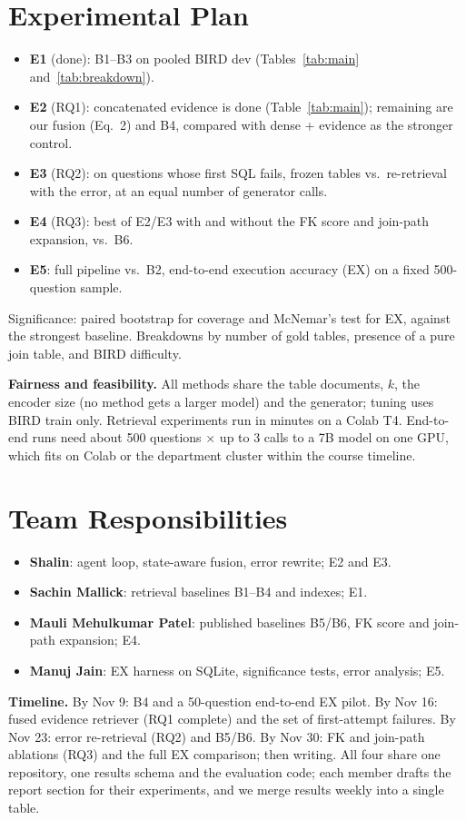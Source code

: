 \documentclass[sigconf,nonacm]{acmart}
\begin{document}
\section{Experimental Plan}
\begin{itemize}
\item \textbf{E1} (done): B1--B3 on pooled BIRD dev (Tables~\ref{tab:main} and~\ref{tab:breakdown}).
\item \textbf{E2} (RQ1): concatenated evidence is done (Table~\ref{tab:main}); remaining are our fusion (Eq.~2) and B4, compared with dense + evidence as the stronger control.
\item \textbf{E3} (RQ2): on questions whose first SQL fails, frozen tables vs.\ re-retrieval with the error, at an equal number of generator calls.
\item \textbf{E4} (RQ3): best of E2/E3 with and without the FK score and join-path expansion, vs.\ B6.
\item \textbf{E5}: full pipeline vs.\ B2, end-to-end execution accuracy (EX) on a fixed 500-question sample.
\end{itemize}
Significance: paired bootstrap for coverage and McNemar's test for EX, against the strongest baseline. Breakdowns by number of gold tables, presence of a pure join table, and BIRD difficulty.

\textbf{Fairness and feasibility.} All methods share the table documents, $k$, the encoder size (no method gets a larger model) and the generator; tuning uses BIRD train only. Retrieval experiments run in minutes on a Colab T4. End-to-end runs need about 500 questions $\times$ up to 3 calls to a 7B model on one GPU, which fits on Colab or the department cluster within the course timeline.

\section{Team Responsibilities}
\begin{itemize}
\item \textbf{Shalin}: agent loop, state-aware fusion, error rewrite; E2 and E3.
\item \textbf{Sachin Mallick}: retrieval baselines B1--B4 and indexes; E1.
\item \textbf{Mauli Mehulkumar Patel}: published baselines B5/B6, FK score and join-path expansion; E4.
\item \textbf{Manuj Jain}: EX harness on SQLite, significance tests, error analysis; E5.
\end{itemize}
\textbf{Timeline.} By Nov 9: B4 and a 50-question end-to-end EX pilot. By Nov 16: fused evidence retriever (RQ1 complete) and the set of first-attempt failures. By Nov 23: error re-retrieval (RQ2) and B5/B6. By Nov 30: FK and join-path ablations (RQ3) and the full EX comparison; then writing.
All four share one repository, one results schema and the evaluation code; each member drafts the report section for their experiments, and we merge results weekly into a single table.
\end{document}
